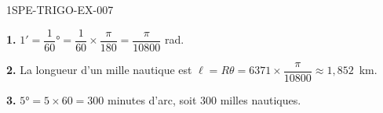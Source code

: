 \begin{corrige}{1SPE-TRIGO-EX-007}

\textbf{1.} $1' = \dfrac{1}{60}° = \dfrac{1}{60} \times \dfrac{\pi}{180} = \dfrac{\pi}{10800}$ rad.

\textbf{2.} La longueur d'un mille nautique est $\ell = R\theta = 6371 \times \dfrac{\pi}{10800} \approx 1{,}852$~km.

\textbf{3.} $5° = 5 \times 60 = 300$ minutes d'arc, soit $300$ milles nautiques.

\end{corrige}
